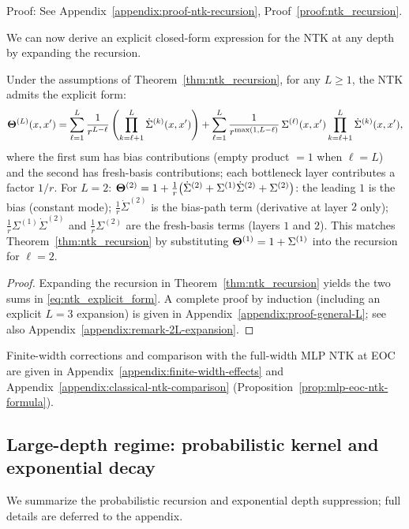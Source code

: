 Proof: See Appendix~\ref{appendix:proof-ntk-recursion}, Proof~\ref{proof:ntk_recursion}.

We can now derive an explicit closed-form expression for the NTK at any depth by expanding the recursion.

\begin{corollary}\label{cor:general_L_layer_ntk}
Under the assumptions of Theorem~\ref{thm:ntk_recursion}, for any \( L\ge1 \), the NTK admits the explicit form:
\begin{equation}
\label{eq:ntk_explicit_form}
\boldsymbol{\Theta}^{(L)}(x,x') = \sum_{\ell=1}^{L} \frac{1}{r^{L-\ell}}\left(\prod_{k=\ell+1}^{L} \dot{\Sigma}^{(k)}(x,x')\right) + \sum_{\ell=1}^{L} \frac{1}{r^{\max(1,L-\ell)}}\,\Sigma^{(\ell)}(x,x') \prod_{k=\ell+1}^{L} \dot{\Sigma}^{(k)}(x,x'),
\end{equation}
where the first sum has bias contributions (empty product \( = 1 \) when \( \ell=L \)) and the second has fresh-basis contributions; each bottleneck layer contributes a factor \( 1/r \). For \( L=2 \): \( \boldsymbol{\Theta}^{(2)} = 1 + \frac{1}{r}\bigl(\dot{\Sigma}^{(2)} + \Sigma^{(1)}\dot{\Sigma}^{(2)} + \Sigma^{(2)}\bigr) \): the leading \(1\) is the bias (constant mode); \( \frac{1}{r}\dot{\Sigma}^{(2)} \) is the bias-path term (derivative at layer \(2\) only); \( \frac{1}{r}\Sigma^{(1)}\dot{\Sigma}^{(2)} \) and \( \frac{1}{r}\Sigma^{(2)} \) are the fresh-basis terms (layers \(1\) and \(2\)). This matches Theorem~\ref{thm:ntk_recursion} by substituting \( \boldsymbol{\Theta}^{(1)}=1+\Sigma^{(1)} \) into the recursion for \( \ell=2 \).
\end{corollary}

\begin{proof}
\label{proof:general_L_ntk_inline}
Expanding the recursion in Theorem~\ref{thm:ntk_recursion} yields the two sums in \eqref{eq:ntk_explicit_form}. A complete proof by induction (including an explicit \(L=3\) expansion) is given in Appendix~\ref{appendix:proof-general-L}; see also Appendix~\ref{appendix:remark-2L-expansion}.
\end{proof}
Finite-width corrections and comparison with the full-width MLP NTK at EOC are given in Appendix~\ref{appendix:finite-width-effects} and Appendix~\ref{appendix:classical-ntk-comparison} (Proposition~\ref{prop:mlp-eoc-ntk-formula}).

\subsection{Large-depth regime: probabilistic kernel and exponential decay}
\label{subsec:large-depth}
We summarize the probabilistic recursion and exponential depth suppression; full details are deferred to the appendix.

